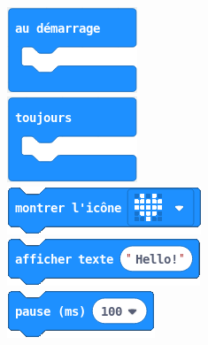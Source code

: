 \begin{minipage}[t]{0.25\linewidth}~\\
\vspace{5mm}

  	\includegraphics[scale=0.4]{res/blocsMkCd/MB_makecode_audemarrage.png}\\[0.5em]
  	\includegraphics[scale=0.4]{res/blocsMkCd/MB_makecode_toujours.png}\\[0.5em]
    \includegraphics[scale=0.4]{res/blocsMkCd/MB_makecode_base-icone.png}\\[0.5em]
    \includegraphics[scale=0.4]{res/blocsMkCd/MB_makecode_base-texte.png}\\[0.5em]
    \includegraphics[scale=0.4]{res/blocsMkCd/MB_makecode_base-pause.png}


\end{minipage}



